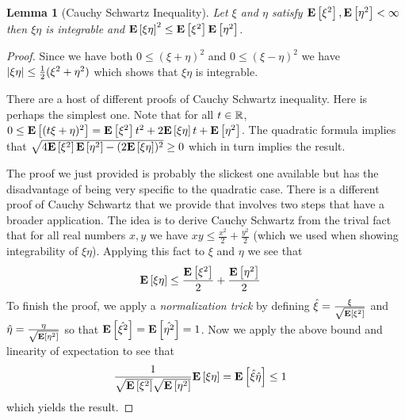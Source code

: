 \documentclass{amsart}
\newtheorem{lem}[thm]{Lemma}
\theoremstyle{remark}
\theoremstyle{definition}
\begin{document}
\begin{lem}[Cauchy Schwartz Inequality]\label{CauchySchwartz}Let $\xi$
  and $\eta$ satisfy $\textbf{E}\left[\xi^2\right], \textbf{E}\left[\eta^2\right] < \infty$ then $\xi \eta$ is integrable and
  $\textbf{E}\left[\xi \eta\right]^2 \leq \textbf{E}\left[\xi^2\right]
  \textbf{E}\left[\eta^2\right]$.
\end{lem}
\begin{proof}
Since we have both $0 \leq (\xi + \eta)^2$ and $0 \leq (\xi - \eta)^2$
we have $\left \vert \xi \eta \right \vert \leq \frac{1}{2}(\xi^2 + \eta^2)$ which shows
that $\xi \eta$ is integrable.

There are a host of different proofs of Cauchy Schwartz inequality.  Here is perhaps
the simplest one.  Note that for all $t \in \mathbb{R}$, $0 \leq \textbf{E}\left[(t \xi +
\eta)^2\right] = \textbf{E}\left[\xi^2\right] t^2 + 2 \textbf{E}\left[\xi \eta\right] t +
\textbf{E}\left[\eta^2\right]$.  The quadratic formula implies that
$\sqrt{4 \textbf{E}\left[\xi^2\right] \textbf{E}\left[\eta^2\right] - (2
  \textbf{E}\left[\xi \eta\right])^2 } \geq 0$ which in turn implies the
result.

The proof we just provided is probably the slickest one available but
has the disadvantage of being very specific to the quadratic case.  
There is a different proof of Cauchy Schwartz that we provide that
involves two steps that have a broader application.  The idea is to
derive Cauchy Schwartz from the trival fact that for all real numbers
$x,y$ we have $xy \leq \frac{x^2}{2} + \frac{y^2}{2}$ (which we used when showing
integrability of $\xi\eta$).  Applying this fact to $\xi$ and $\eta$ we see
that
\begin{align*}
\textbf{E}\left[\xi \eta\right] &\leq \frac{\textbf{E}\left[\xi^2\right]}{2} + \frac{\textbf{E}\left[\eta^2\right]}{2}
\end{align*}
To finish the proof, we apply a \emph{normalization trick} by defining
$\hat{\xi} = \frac{\xi}{\sqrt{\textbf{E}\left[\xi^2\right]}}$ and $\hat{\eta} =
\frac{\eta}{\sqrt{\textbf{E}\left[\eta^2\right]}}$ so that
$\textbf{E}\left[\hat{\xi^2}\right] = \textbf{E}\left[\hat{\eta^2}\right] =1$.  Now we apply the above bound and linearity of expectation to see that
\begin{align*}
\frac{1}{\sqrt{\textbf{E}\left[\xi^2\right]}\sqrt{\textbf{E}\left[\eta^2\right]}}
\textbf{E}\left[\xi\eta\right] &= \textbf{E}\left[\hat{\xi}\hat{\eta}\right] \leq 1
\end{align*}
which yields the result.
\end{proof}
\end{document}
